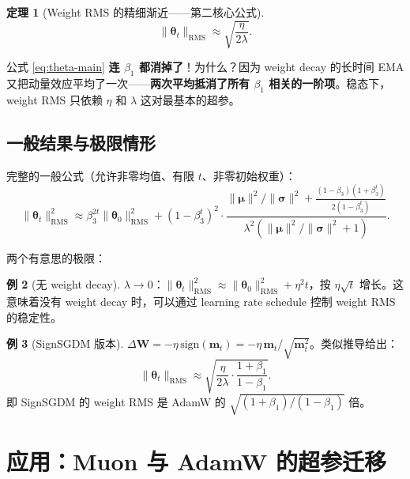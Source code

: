 \documentclass[11pt,a4paper]{ctexart}
\newtheorem{theorem}{定理}[section]
\theoremstyle{definition}
\newtheorem{example}[theorem]{例}
\theoremstyle{remark}
\newcommand{\RMS}{\mathrm{RMS}}
\begin{document}
\begin{theorem}[Weight RMS 的精细渐近——第二核心公式]
\begin{equation}
\boxed{\;
\|\bm{\theta}_t\|_\RMS \approx \sqrt{\frac{\eta}{2\lambda}}.
\;}
\label{eq:theta-main}
\end{equation}
\end{theorem}
 
\begin{keyinsight}
公式 \eqref{eq:theta-main} \textbf{连 $\beta_1$ 都消掉了}！为什么？因为 weight decay 的长时间 EMA 又把动量效应平均了一次——\textbf{两次平均抵消了所有 $\beta_1$ 相关的一阶项}。稳态下，weight RMS 只依赖 $\eta$ 和 $\lambda$ 这对最基本的超参。
\end{keyinsight}
 
\subsection{一般结果与极限情形}
 
完整的一般公式（允许非零均值、有限 $t$、非零初始权重）：
\begin{equation}
\|\bm{\theta}_t\|_\RMS^2 \approx \beta_3^{2t} \|\bm{\theta}_0\|_\RMS^2 
+ (1-\beta_3^t)^2 \cdot \frac{\|\bm{\mu}\|^2/\|\bm{\sigma}\|^2 + \frac{(1-\beta_3)(1+\beta_3^t)}{2(1-\beta_3^t)}}{\lambda^2(\|\bm{\mu}\|^2/\|\bm{\sigma}\|^2 + 1)}.
\end{equation}
 
两个有意思的极限：
 
\begin{example}[无 weight decay]
$\lambda \to 0$：$\|\bm{\theta}_t\|_\RMS^2 \approx \|\bm{\theta}_0\|_\RMS^2 + \eta^2 t$，按 $\eta\sqrt{t}$ 增长。这意味着没有 weight decay 时，可以通过 learning rate schedule 控制 weight RMS 的稳定性。
\end{example}
 
\begin{example}[SignSGDM 版本]
$\Delta\bm{W} = -\eta\, \mathrm{sign}(\bm{m}_t) = -\eta\, \bm{m}_t/\sqrt{\bm{m}_t^2}$。类似推导给出：
\[
\|\bm{\theta}_t\|_\RMS \approx \sqrt{\frac{\eta}{2\lambda} \cdot \frac{1+\beta_1}{1-\beta_1}}.
\]
即 SignSGDM 的 weight RMS 是 AdamW 的 $\sqrt{(1+\beta_1)/(1-\beta_1)}$ 倍。
\end{example}
 
\section{应用：Muon 与 AdamW 的超参迁移}
 
\end{document}
